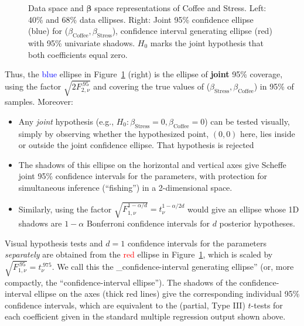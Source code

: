 \documentclass[
  letterpaper,
  10pt,
  krantz2]{krantz}
\providecommand{\tightlist}{%
  \setlength{\itemsep}{0pt}\setlength{\parskip}{0pt}}\usepackage{longtable,booktabs,array}
\begin{document}
{\begin{figure}
{}

\caption{\label{fig-coffee-data-beta-both}Data space and
\(\mathbf{\beta}\) space representations of Coffee and Stress. Left:
40\% and 68\% data ellipses. Right: Joint 95\% confidence ellipse (blue)
for (\(\beta_{\text{Coffee}}, \beta_{\text{Stress}}\)), confidence
interval generating ellipse (red) with 95\% univariate shadows. \(H_0\)
marks the joint hypothesis that both coefficients equal zero.}

\end{figure}%

Thus, the \textcolor{blue}{blue} ellipse in
Figure~\ref{fig-coffee-data-beta-both} (right) is the ellipse of
\textbf{joint} 95\% coverage, using the factor
\(\sqrt{2 F^{.95}_{2, \nu}}\) and covering the true values of
(\(\beta_{\mathrm{Stress}}, \beta_{\mathrm{Coffee}}\)) in 95\% of
samples. Moreover:

\begin{itemize}
\tightlist
\item
  Any \emph{joint} hypothesis (e.g.,
  \(H_0:\beta_{\mathrm{Stress}}=0, \beta_{\mathrm{Coffee}}=0\)) can be
  tested visually, simply by observing whether the hypothesized point,
  \((0, 0)\) here, lies inside or outside the joint confidence ellipse.
  That hypothesis is rejected
\item
  The shadows of this ellipse on the horizontal and vertical axes give
  Scheff\textquotesingle e joint 95\% confidence intervals for the
  parameters, with protection for simultaneous inference (``fishing'')
  in a 2-dimensional space.
\item
  Similarly, using the factor
  \(\sqrt{F^{1-\alpha/d}_{1, \nu}} = t^{1-\alpha/2d}_\nu\) would give an
  ellipse whose 1D shadows are \(1-\alpha\) Bonferroni confidence
  intervals for \(d\) posterior hypotheses.
\end{itemize}

Visual hypothesis tests and \(d=1\) confidence intervals for the
parameters \emph{separately} are obtained from the \textcolor{red}{red}
ellipse in Figure~\ref{fig-coffee-data-beta-both}, which is scaled by
\(\sqrt{F^{.95}_{1, \nu}} = t^{.975}_\nu\). We call this the
\_confidence-interval generating ellipse'' (or, more compactly, the
``confidence-interval ellipse''). The shadows of the confidence-interval
ellipse on the axes (thick red lines) give the corresponding individual
95\% confidence intervals, which are equivalent to the (partial, Type
III) \(t\)-tests for each coefficient given in the standard multiple
regression output shown above.

}
\end{document}
